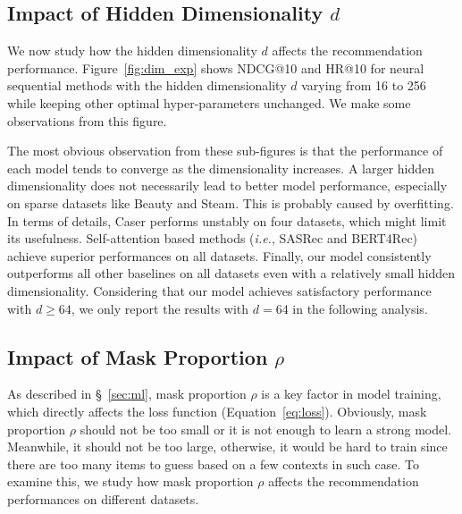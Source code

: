 \subsection{Impact of Hidden Dimensionality $d$}

We now study how the hidden dimensionality $d$ affects the recommendation performance.
Figure~\ref{fig:dim_exp} shows NDCG@10 and HR@10 for neural sequential methods with the hidden dimensionality $d$ varying from 16 to 256 while keeping other optimal hyper-parameters unchanged. We make some observations from this figure.

The most obvious observation from these sub-figures is that the performance of each model tends to converge as the dimensionality increases. A larger hidden dimensionality does not necessarily lead to better model performance, especially on sparse datasets like Beauty and Steam. This is probably caused by overfitting. In terms of details, Caser performs unstably on four datasets, which might limit its usefulness. Self-attention based methods (\textit{i.e.}, SASRec and BERT4Rec) achieve superior performances on all datasets. Finally, our model consistently outperforms all other baselines on all datasets even with a relatively small hidden dimensionality. Considering that our model achieves satisfactory performance with $d {\geq} 64$, we only report the results with $d{=}64$ in the following analysis.

\subsection{Impact of Mask Proportion $\rho$}
\label{sec:mask}


As described in \S~\ref{sec:ml}, mask proportion $\rho$ is a key factor in model training, which directly affects the loss function (Equation~\ref{eq:loss}).
Obviously, mask proportion $\rho$ should not be too small or it is not enough to learn a strong model. Meanwhile, it should not be too large, otherwise, it would be hard to train since there are too many items to guess based on a few contexts in such case. To examine this, we study how mask proportion $\rho$ affects the recommendation performances on different datasets.

